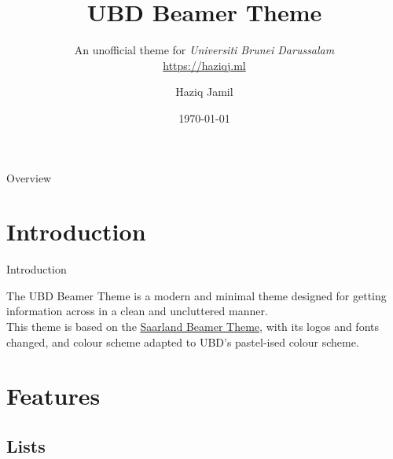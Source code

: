 \documentclass[]{beamer}
\author{Haziq Jamil}
\title{UBD Beamer Theme}
\subtitle{An unofficial theme for \textit{Universiti Brunei Darussalam}\\ \url{https://haziqj.ml}}
\institute{Mathematical Sciences, Faculty of Science, UBD}
\date{\today}
\begin{document}
\begin{frame}[plain]
	\titlepage
\end{frame}

\begin{frame}{Overview}
\tableofcontents
\end{frame}



\section{Introduction}

\begin{frame}{Introduction}

The UBD Beamer Theme is a modern and minimal theme designed for getting information across in a clean and uncluttered manner.\\[1em]

This theme is based on the \href{https://github.com/kailashbuki/beamerthemesaarland}{Saarland Beamer Theme}, with its logos and fonts changed, and colour scheme adapted to UBD's pastel-ised colour scheme. 
	
\end{frame}

\section{Features}
	
\subsection{Lists}
\end{document}
